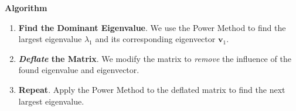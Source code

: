 \begin{flushleft}
    \textcolor{Green3}{ \textbf{Algorithm}}
\end{flushleft}
\begin{enumerate}
    \item \textbf{Find the Dominant Eigenvalue}. We use the Power Method to find the largest eigenvalue $\lambda_{1}$ and its corresponding eigenvector $\mathbf{v}_{1}$.
    
    \item \textbf{\emph{Deflate} the Matrix}. We modify the matrix to \emph{remove} the influence of the found eigenvalue and eigenvector.

    \item \textbf{Repeat}. Apply the Power Method to the deflated matrix to find the next largest eigenvalue.
\end{enumerate}
